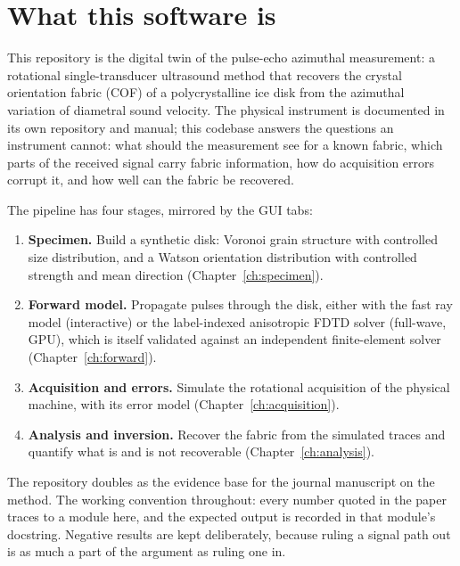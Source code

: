\section{What this software is}

This repository is the digital twin of the pulse-echo azimuthal
measurement: a rotational single-transducer ultrasound method that
recovers the crystal orientation fabric (COF) of a polycrystalline ice
disk from the azimuthal variation of diametral sound velocity. The
physical instrument is documented in its own repository and manual;
this codebase answers the questions an instrument cannot: what should
the measurement see for a known fabric, which parts of the received
signal carry fabric information, how do acquisition errors corrupt it,
and how well can the fabric be recovered.

The pipeline has four stages, mirrored by the GUI tabs:

\begin{enumerate}
  \item \textbf{Specimen.} Build a synthetic disk: Voronoi grain
    structure with controlled size distribution, and a Watson
    orientation distribution with controlled strength and mean
    direction (Chapter~\ref{ch:specimen}).
  \item \textbf{Forward model.} Propagate pulses through the disk,
    either with the fast ray model (interactive) or the label-indexed
    anisotropic FDTD solver (full-wave, GPU), which is itself
    validated against an independent finite-element solver
    (Chapter~\ref{ch:forward}).
  \item \textbf{Acquisition and errors.} Simulate the rotational
    acquisition of the physical machine, with its error model
    (Chapter~\ref{ch:acquisition}).
  \item \textbf{Analysis and inversion.} Recover the fabric from the
    simulated traces and quantify what is and is not recoverable
    (Chapter~\ref{ch:analysis}).
\end{enumerate}

The repository doubles as the evidence base for the journal
manuscript on the method. The working convention throughout: every
number quoted in the paper traces to a module here, and the expected
output is recorded in that module's docstring. Negative results are
kept deliberately, because ruling a signal path out is as much a part
of the argument as ruling one in.
